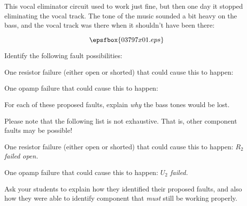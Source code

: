 

This vocal eliminator circuit used to work just fine, but then one day it stopped eliminating the vocal track.  The tone of the music sounded a bit heavy on the bass, and the vocal track was there when it shouldn't have been there:

$$\epsfbox{03797x01.eps}$$

Identify the following fault possibilities:

\vskip 10pt

\noindent
One resistor failure (either open or shorted) that could cause this to happen:

\vskip 15pt

\noindent
One opamp failure that could cause this to happen:

\vskip 15pt

For each of these proposed faults, explain {\it why} the bass tones would be lost.







Please note that the following list is not exhaustive.  That is, other component faults may be possible!

\vskip 10pt

\noindent
One resistor failure (either open or shorted) that could cause this to happen: {\it $R_2$ failed open.}

\vskip 15pt

\noindent
One opamp failure that could cause this to happen: {\it $U_2$ failed.}







Ask your students to explain how they identified their proposed faults, and also how they were able to identify component that {\it must} still be working properly.




